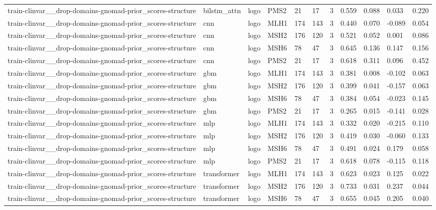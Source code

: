 \begin{table}[t]
\begin{tabular}{lllllllllll}
train-clinvar\_\_drop-domains-gnomad-prior\_scores-structure & bilstm\_attn & logo & PMS2 & 21 & 17 & 3 & 0.559 & 0.088 & 0.033 & 0.220 \\
train-clinvar\_\_drop-domains-gnomad-prior\_scores-structure & cnn & logo & MLH1 & 174 & 143 & 3 & 0.440 & 0.070 & -0.089 & 0.054 \\
train-clinvar\_\_drop-domains-gnomad-prior\_scores-structure & cnn & logo & MSH2 & 176 & 120 & 3 & 0.521 & 0.052 & 0.001 & 0.086 \\
train-clinvar\_\_drop-domains-gnomad-prior\_scores-structure & cnn & logo & MSH6 & 78 & 47 & 3 & 0.645 & 0.136 & 0.147 & 0.156 \\
train-clinvar\_\_drop-domains-gnomad-prior\_scores-structure & cnn & logo & PMS2 & 21 & 17 & 3 & 0.618 & 0.311 & 0.096 & 0.452 \\
train-clinvar\_\_drop-domains-gnomad-prior\_scores-structure & gbm & logo & MLH1 & 174 & 143 & 3 & 0.381 & 0.008 & -0.102 & 0.063 \\
train-clinvar\_\_drop-domains-gnomad-prior\_scores-structure & gbm & logo & MSH2 & 176 & 120 & 3 & 0.399 & 0.041 & -0.157 & 0.063 \\
train-clinvar\_\_drop-domains-gnomad-prior\_scores-structure & gbm & logo & MSH6 & 78 & 47 & 3 & 0.384 & 0.054 & -0.023 & 0.145 \\
train-clinvar\_\_drop-domains-gnomad-prior\_scores-structure & gbm & logo & PMS2 & 21 & 17 & 3 & 0.265 & 0.015 & -0.141 & 0.028 \\
train-clinvar\_\_drop-domains-gnomad-prior\_scores-structure & mlp & logo & MLH1 & 174 & 143 & 3 & 0.332 & 0.020 & -0.215 & 0.110 \\
train-clinvar\_\_drop-domains-gnomad-prior\_scores-structure & mlp & logo & MSH2 & 176 & 120 & 3 & 0.419 & 0.030 & -0.060 & 0.133 \\
train-clinvar\_\_drop-domains-gnomad-prior\_scores-structure & mlp & logo & MSH6 & 78 & 47 & 3 & 0.491 & 0.024 & 0.179 & 0.058 \\
train-clinvar\_\_drop-domains-gnomad-prior\_scores-structure & mlp & logo & PMS2 & 21 & 17 & 3 & 0.618 & 0.078 & -0.115 & 0.118 \\
train-clinvar\_\_drop-domains-gnomad-prior\_scores-structure & transformer & logo & MLH1 & 174 & 143 & 3 & 0.623 & 0.023 & 0.125 & 0.022 \\
train-clinvar\_\_drop-domains-gnomad-prior\_scores-structure & transformer & logo & MSH2 & 176 & 120 & 3 & 0.733 & 0.031 & 0.237 & 0.044 \\
train-clinvar\_\_drop-domains-gnomad-prior\_scores-structure & transformer & logo & MSH6 & 78 & 47 & 3 & 0.655 & 0.045 & 0.205 & 0.040 \\

\end{tabular}
\end{table}
